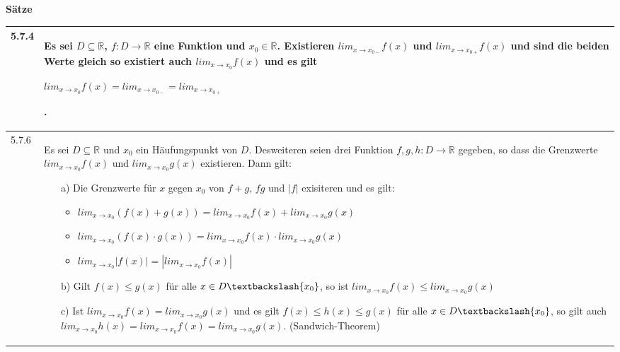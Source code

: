     \noindent 
    \textbf{Sätze}
    \begin{table}[H]
    \begin{tabularx}{\textwidth}{X m{16cm}}
        \toprule

        5.7.4 & Es sei $D \subseteq \mathbb{R}$, $f: D \rightarrow \mathbb{R}$ eine Funktion und $x_0 \in \mathbb{R}$. 
                Existieren $lim_{x \rightarrow x_{0-}}f(x)$ und $lim_{x \rightarrow x_{0+}}f(x)$ und sind die beiden Werte gleich
                so existiert auch $lim_{x \rightarrow x_0} f(x)$ und es gilt \hfill \break
                \centerline{$lim_{x \rightarrow x_0} f(x) = lim_{x \rightarrow x_{0-}} = lim_{x \rightarrow x_{0+}}$}.  \\
        \midrule
        5.7.6 & Es sei $D \subseteq \mathbb{R}$ und $x_0$ ein Häufungspunkt von $D$. Desweiteren seien drei Funktion $f,g,h:
                D \rightarrow \mathbb{R}$ gegeben, so dass die Grenzwerte $lim_{x \rightarrow x_0} f(x)$ und
                $lim_{x \rightarrow x_0} g(x)$ existieren. Dann gilt:
                \begin{itemize}
                    \item[a)] Die Grenzwerte für $x$ gegen $x_0$ von $f+g$, $fg$ und $|f|$ exisiteren und es gilt:
                        \begin{itemize}
                            \item $lim_{x \rightarrow x_0} (f(x) + g(x)) = lim_{x \rightarrow x_0} f(x) + lim_{x \rightarrow x_0} g(x)$
                            \item $lim_{x \rightarrow x_0} (f(x) \cdot g(x)) = lim_{x \rightarrow x_0} f(x) \cdot lim_{x \rightarrow x_0} g(x)$
                            \item $lim_{x \rightarrow x_0} |f(x)| = |lim_{x \rightarrow x_0} f(x)|$
                        \end{itemize}
                    \item[b)] Gilt $f(x) \leq g(x)$ für alle $x \in D \textbackslash \{x_0\}$, so ist $lim_{x \rightarrow x_0} f(x)
                                \leq lim_{x \rightarrow x_0}g(x)$
                    \item[c)] Ist $lim_{x \rightarrow x_0} f(x) = lim_{x \rightarrow x_0} g(x)$ und es gilt 
                                $f(x) \leq h(x) \leq g(x)$ für alle $x \in D \textbackslash \{x_0\}$, so gilt auch
                                $lim_{x \rightarrow x_0} h(x) = lim_{x \rightarrow x_0}f(x) = lim_{x \rightarrow x_0}g(x)$.
                                (Sandwich-Theorem)

\end{itemize}
\end{tabularx}
\end{table}
